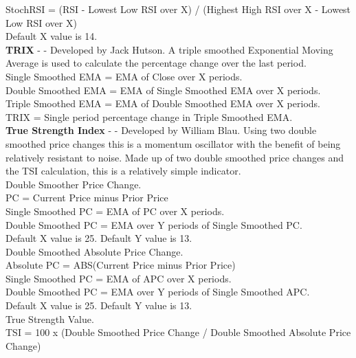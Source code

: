 \documentclass[conference]{IEEEtran}
\begin{document}
\noindent
StochRSI = (RSI - Lowest Low RSI over X) / (Highest High RSI over X - Lowest Low RSI over X)\\
Default X value is 14.\\

\iffalse
[]
\fi

\noindent
\textbf{TRIX} - \cite{Hutson1983} - Developed by Jack Hutson. A triple smoothed Exponential Moving Average is used to calculate the percentage change over the last period.\\

\noindent
Single Smoothed EMA = EMA of Close over X periods.\\
Double Smoothed EMA = EMA of Single Smoothed EMA over X periods.\\
Triple Smoothed EMA = EMA of Double Smoothed EMA over X periods.\\
TRIX = Single period percentage change in Triple Smoothed EMA. \\

\iffalse
[]
\fi

\noindent
\textbf{True Strength Index} - \cite{Blau1995} - Developed by William Blau. Using two double smoothed price changes this is a momentum oscillator with the benefit of being relatively resistant to noise. Made up of two double smoothed price changes and the TSI calculation, this is a relatively simple indicator.\\

\noindent
Double Smoother Price Change.\\
PC = Current Price minus Prior Price\\
Single Smoothed PC = EMA of PC over X periods.\\
Double Smoothed PC = EMA over Y periods of Single Smoothed PC.\\
Default X value is 25. Default Y value is 13.\\

\noindent
Double Smoothed Absolute Price Change. \\
Absolute PC = ABS(Current Price minus Prior Price)\\
Single Smoothed PC = EMA of APC over X periods.\\
Double Smoothed PC = EMA over Y periods of Single Smoothed APC.\\
Default X value is 25. Default Y value is 13.\\

\noindent
True Strength Value.\\
TSI = 100 x (Double Smoothed Price Change / Double Smoothed Absolute Price Change)\\
\end{document}
